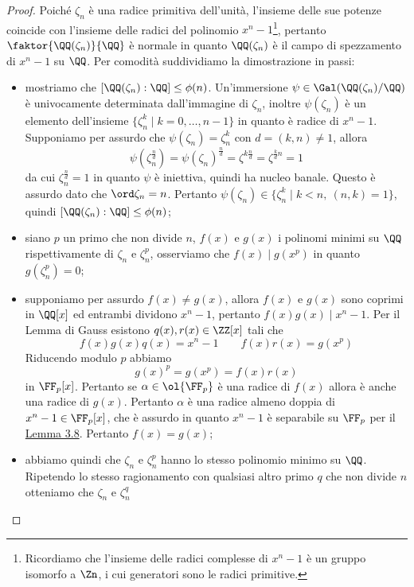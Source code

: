 \documentclass[11pt]{scrartcl}
\begin{document}
	\begin{proof}
		Poiché $\zeta_n$ è una radice primitiva dell'unità, l'insieme delle sue 
		potenze coincide con l'insieme delle radici del polinomio $x^n - 1$\footnote{
			Ricordiamo che l'insieme delle radici complesse di $x^n -1$ è un gruppo 
			isomorfo a $\Zn$, i cui generatori sono le radici primitive.
		},
		pertanto $\faktor{\QQ(\zeta_n)}{\QQ}$ è normale in quanto $\QQ(\zeta_n)$
		è il campo di spezzamento di $x^n - 1$ su $\QQ$. Per comodità suddividiamo 
		la dimostrazione in passi:
		\begin{itemize}
			\item mostriamo che $[\QQ(\zeta_n):\QQ] \leq \phi(n)$. Un'immersione
			$\psi \in \Gal(\QQ(\zeta_n)/\QQ)$ è univocamente determinata dall'immagine
			di $\zeta_n$, inoltre $\psi(\zeta_n)$ è un elemento dell'insieme 
			$\{\zeta_n^k\mid k = 0, \ldots, n - 1\}$ in quanto è radice di $x^n - 1$.
			Supponiamo per assurdo che $\psi(\zeta_n) = \zeta_n^k$ con $d = (k, n)\neq 1$, 
			allora
			\[
			\psi(\zeta_n^{\frac n d}) = \psi(\zeta_n)^{\frac n d} = \zeta^{k\frac n d} = 
			\zeta^{\frac k d n} = 1
			\]
			da cui $\zeta_n^{\frac n d} = 1$ in quanto $\psi$ è iniettiva, quindi ha 
			nucleo banale. Questo è assurdo dato che $\ord \zeta_n = n$.
			Pertanto $\psi(\zeta_n) \in \{\zeta_n^k\mid k < n,~(n, k) = 1\}$, quindi
			$[\QQ(\zeta_n):\nolinebreak\QQ] \leq \phi(n)$;
			\item siano $p$ un primo che non divide $n$, $f(x)$ e $g(x)$ i polinomi 
			minimi su $\QQ$ rispettivamente di $\zeta_n$ e $\zeta_n^p$, osserviamo
			che $f(x) \mid g(x^p)$ in quanto $g(\zeta_n^p) = 0$;
			\item supponiamo per assurdo $f(x) \neq g(x)$, allora $f(x)$ e $g(x)$
			sono coprimi in $\QQ[x]$ ed entrambi dividono $x^n - 1$, pertanto $f(x)g(x) \mid x^n -1$.
			Per il Lemma di Gauss esistono $q(x), r(x) \in \ZZ[x]$ tali che 
			\[
			f(x)g(x)q(x) = x^n - 1\qquad f(x)r(x) = g(x^p)
			\]
			Riducendo modulo $p$ abbiamo 
			\[
			g(x)^p = g(x^p) = f(x)r(x)
			\]
			in $\FF_p[x]$. Pertanto se $\alpha \in \ol{\FF_p}$ è una radice di $f(x)$
			allora è anche una radice di $g(x)$. Pertanto $\alpha$ è una radice
			almeno doppia di $x^n - 1 \in \FF_p[x]$, che è assurdo in quanto $x^n -1$
			è separabile su $\FF_p$ per il \hyperref[lemma3.8]{Lemma 3.8}. Pertanto 
			$f(x) = g(x)$;
			\item abbiamo quindi che $\zeta_n$ e $\zeta_n^p$ hanno lo stesso polinomio 
			minimo su $\QQ$. Ripetendo lo stesso ragionamento con qualsiasi altro 
			primo $q$ che non divide $n$ otteniamo che $\zeta_n$ e $\zeta_n^q$ 

\end{itemize}
\end{proof}
\end{document}
